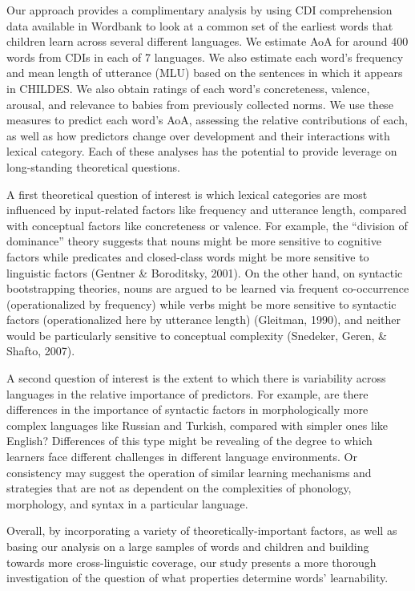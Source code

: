 \documentclass[10pt, letterpaper]{article}
\begin{document}
Our approach provides a complimentary analysis by using CDI
comprehension data available in Wordbank to look at a common set of the
earliest words that children learn across several different languages.
We estimate AoA for around 400 words from CDIs in each of 7 languages.
We also estimate each word's frequency and mean length of utterance
(MLU) based on the sentences in which it appears in CHILDES. We also
obtain ratings of each word's concreteness, valence, arousal, and
relevance to babies from previously collected norms. We use these
measures to predict each word's AoA, assessing the relative
contributions of each, as well as how predictors change over development
and their interactions with lexical category. Each of these analyses has
the potential to provide leverage on long-standing theoretical
questions.

A first theoretical question of interest is which lexical categories are
most influenced by input-related factors like frequency and utterance
length, compared with conceptual factors like concreteness or valence.
For example, the ``division of dominance'' theory suggests that nouns
might be more sensitive to cognitive factors while predicates and
closed-class words might be more sensitive to linguistic factors
(Gentner \& Boroditsky, 2001). On the other hand, on syntactic
bootstrapping theories, nouns are argued to be learned via frequent
co-occurrence (operationalized by frequency) while verbs might be more
sensitive to syntactic factors (operationalized here by utterance
length) (Gleitman, 1990), and neither would be particularly sensitive to
conceptual complexity (Snedeker, Geren, \& Shafto, 2007).

A second question of interest is the extent to which there is
variability across languages in the relative importance of predictors.
For example, are there differences in the importance of syntactic
factors in morphologically more complex languages like Russian and
Turkish, compared with simpler ones like English? Differences of this
type might be revealing of the degree to which learners face different
challenges in different language environments. Or consistency may
suggest the operation of similar learning mechanisms and strategies that
are not as dependent on the complexities of phonology, morphology, and
syntax in a particular language.

Overall, by incorporating a variety of theoretically-important factors,
as well as basing our analysis on a large samples of words and children
and building towards more cross-linguistic coverage, our study presents
a more thorough investigation of the question of what properties
determine words' learnability.
\end{document}
